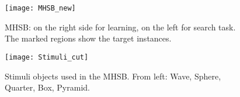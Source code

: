 \begin{figure}[H]
	\begin{minipage}[t]{0.59\textwidth}
		\texttt{[image: MHSB\_new]}
		\captionsetup{width=0.9\linewidth}
		\caption{MHSB: on the right side for learning, on the left for search task. The marked regions show the target instances.}
		\label{MHSBBOARDS}
	\end{minipage}
	\hspace{\fill}
	\begin{minipage}[t]{0.39\textwidth}
		\texttt{[image: Stimuli\_cut]}
		\captionsetup{width=0.9\linewidth}
		\caption{Stimuli objects used in the MHSB. From left: Wave, Sphere, Quarter, Box, Pyramid.}
		\label{Stimuli}
	\end{minipage}
\end{figure}


